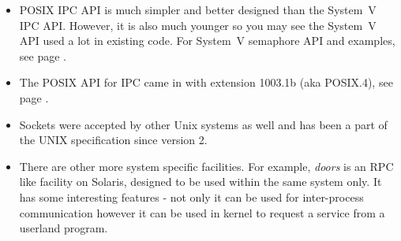 \begin{itemize}
\item POSIX IPC API is much simpler and better designed than the System~V IPC
API.  However, it is also much younger so you may see the System~V API used a
lot in existing code.  For System~V semaphore API and examples, see page
\pageref{SYSVSEM}.
\item The POSIX API for IPC came in with extension 1003.1b (aka POSIX.4), see
page \pageref{POSIX4}.
\item Sockets were accepted by other Unix systems as well and has been a part of
the UNIX specification since version 2.
\item There are other more system specific facilities.  For example,
\emph{doors} is an RPC like facility on Solaris, designed to be used within the
same system only. It has some interesting features - not only it can be used for
inter-process communication however it can be used in kernel to request a
service from a userland program.
\end{itemize}

\label{SYNCHRONIZATIONEND}

\endinput
